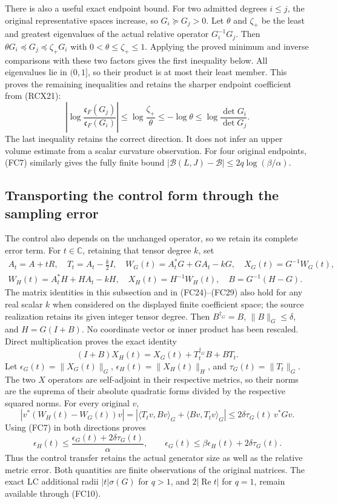 \documentclass{article}
\begin{document}
There is also a useful exact endpoint bound. For two admitted degrees
$i\le j$, the original representative spaces increase, so $G_i\succeq
G_j>0$. Let $\theta$ and $\zeta_+$ be the least and greatest
eigenvalues of the actual relative operator $G_i^{-1}G_j$.
Then $\theta G_i\preceq G_j\preceq\zeta_+G_i$ with
$0<\theta\le\zeta_+\le1$. Applying the proved minimum and inverse
comparisons with these two factors gives the first inequality below.
All eigenvalues lie in $(0,1]$, so their product is at most their
least member. This proves the remaining inequalities and retains
the sharper endpoint coefficient from (RCX21):
\[
 \left|\log\frac{\mathfrak c_F(G_j)}{\mathfrak c_F(G_i)}\right|
 \le\log\frac{\zeta_+}{\theta}
 \le-\log\theta\le\log\frac{\det G_i}{\det G_j}.
 \tag{FC13}
\]
The last inequality retains the correct direction. It does not infer
an upper volume estimate from a scalar curvature observation.
For four original endpoints, (FC7) similarly gives the fully finite
bound $|\mathcal B(L,J)-\mathcal B|\le2q\log(\beta/\alpha)$.

\subsection{Transporting the control form through the sampling error}

The control also depends on the unchanged operator, so we retain its
complete error term. For $t\in\mathbb C$, retaining that tensor degree
$k$, set
\[
\begin{gathered}
 A_t=A+tR,\quad T_t=A_t-\tfrac k2I,\quad
 W_G(t)=A_t^*G+GA_t-kG,\quad X_G(t)=G^{-1}W_G(t),\\
 W_H(t)=A_t^*H+HA_t-kH,\quad X_H(t)=H^{-1}W_H(t),\quad
 B=G^{-1}(H-G).
\end{gathered}\tag{FC14}
\]
The matrix identities in this subsection and in (FC24)--(FC29)
also hold for any real scalar $k$ when considered on the displayed
finite coefficient space; the source realization retains its given
integer tensor degree.
Then $B^{\dagger_G}=B$, $\|B\|_G\le\delta$, and $H=G(I+B)$.
No coordinate vector or inner product has been rescaled. Direct
multiplication proves the exact identity
\[
 (I+B)X_H(t)=X_G(t)+T_t^{\dagger_G}B+BT_t.
 \tag{FC15}
\]
Let $\epsilon_G(t)=\|X_G(t)\|_G$, $\epsilon_H(t)=\|X_H(t)\|_H$,
and $\tau_G(t)=\|T_t\|_G$. The two $X$ operators are self-adjoint
in their respective metrics, so their norms are the suprema of their
absolute quadratic forms divided by the respective squared norms.
For every original $v$,
\[
 |v^*(W_H(t)-W_G(t))v|
 =|\langle T_tv,Bv\rangle_G+\langle Bv,T_tv\rangle_G|
 \le2\delta\tau_G(t)\,v^*Gv.
 \tag{FC16}
\]
Using (FC7) in both directions proves
\[
 \boxed{\epsilon_H(t)\le
  \frac{\epsilon_G(t)+2\delta\tau_G(t)}{\alpha},\qquad
 \epsilon_G(t)\le\beta\epsilon_H(t)+2\delta\tau_G(t).}
 \tag{FC17}
\]
Thus the control transfer retains the actual generator size as well as
the relative metric error. Both quantities are finite observations of
the original matrices. The exact LC additional radii
$|t|\sigma(G)$ for $q>1$, and $2|\operatorname{Re}t|$ for $q=1$,
remain available through (FC10).
\end{document}
